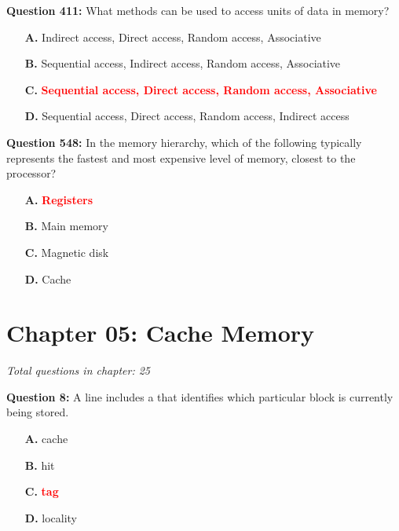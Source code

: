 \documentclass[12pt,a4paper]{article}
\begin{document}
\vspace{0.5cm}

\textbf{Question 411:} What methods can be used to access units of data in memory?

\begin{itemize}
    \item[\textbf{A.}] Indirect access, Direct access, Random access, Associative
    \item[\textbf{B.}] Sequential access, Indirect access, Random access, Associative
    \item[\textbf{C.}] \textcolor{red}{\textbf{Sequential access, Direct access, Random access, Associative}}
    \item[\textbf{D.}] Sequential access, Direct access, Random access, Indirect access
\end{itemize}

\vspace{0.5cm}

\vspace{0.5cm}



\textbf{Question 548:} In the memory hierarchy, which of the following typically represents the fastest and most expensive level of memory, closest to the processor?

\begin{itemize}
    \item[\textbf{A.}] \textcolor{red}{\textbf{Registers}}
    \item[\textbf{B.}] Main memory
    \item[\textbf{C.}] Magnetic disk
    \item[\textbf{D.}] Cache
\end{itemize}

\section{Chapter 05: Cache Memory}
\textit{Total questions in chapter: 25}

\textbf{Question 8:} A line includes a \underline{\hspace{1.5cm}} that identifies which particular block is currently being stored.

\begin{itemize}
    \item[\textbf{A.}] cache
    \item[\textbf{B.}] hit
    \item[\textbf{C.}] \textcolor{red}{\textbf{tag}}
    \item[\textbf{D.}] locality
\end{itemize}
\end{document}
